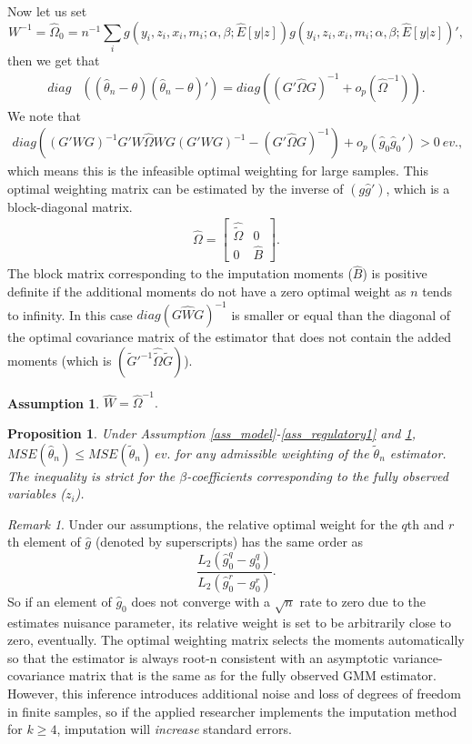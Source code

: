 \documentclass{article}
\newtheorem{assumption}{Assumption}
\newtheorem{proposition}{Proposition}
\theoremstyle{definition}
\theoremstyle{remark}
\newtheorem{remark}{Remark}
\begin{document}
Now let us set
\[W^{-1}=\hat{\Omega}_0=n^{-1}\sum_i g(y_i,z_i,x_i,m_i; \alpha,\beta; \hat{E}[y|z]) g(y_i,z_i,x_i,m_i; \alpha,\beta; \hat{E}[y|z])',
\]
then we get that
\begin{align}
diag&\left((\hat{\theta}_n -\theta)(\hat{\theta}_n -\theta)'\right)= diag\left((G'\hat{\Omega} G)^{-1} + o_p(\hat{\Omega}^{-1})\right).
\end{align}
We note that
\begin{align*}
diag\left((G'WG)^{-1} G'W \hat{\Omega}W G (G'WG)^{-1}-  (G'\hat{\Omega} G)^{-1}\right) + o_p(\hat{g}_0\hat{g}_0')> 0 \ ev.,
\end{align*}
which means this is the infeasible optimal weighting for large samples. This optimal weighting matrix can be estimated by the inverse of $(g\hat{g}')$, which is a block-diagonal matrix.
\begin{align}
\hat{\Omega} = \left[\begin{array}{cc}
\hat{\tilde{\Omega}} & 0 \\ 0 & \hat{B}
\end{array}\right].
\end{align}
The block matrix corresponding to the imputation moments ($\hat{B}$) is positive definite if the additional moments do not have a zero optimal weight as $n$ tends to infinity. In this case $diag(G\hat{W}G)^{-1}$ is smaller or equal than the diagonal of the optimal covariance matrix of the estimator that does not contain the added moments (which is $(\tilde{G}'^{-1}\hat{\tilde{\Omega}} \tilde{G})$).
\begin{assumption}\label{ass_optimalWeighting}
	$\hat{W} = \hat{\Omega}^{-1}.$
\end{assumption}
\begin{proposition}
	Under Assumption \ref{ass_model}-\ref{ass_regulatory1} and \ref{ass_optimalWeighting}, $MSE(\hat{\theta}_n)\leq MSE(\tilde{\theta}_n) \ ev.$ for any admissible weighting of the $\tilde{\theta}_n$ estimator. The inequality is strict for the $\beta$-coefficients corresponding to the fully observed variables ($z_i$).
\end{proposition}

\begin{remark}
	Under our assumptions, the relative optimal weight for the $q$th and $r$th element of $\hat{g}$ (denoted by superscripts) has the same order as
	\[\frac{L_2(\hat{g}_0^q-g_0^q)}{L_2(\hat{g}_0^r-g_0^r)}.
	\]
	So if an element of $\hat{g}_0$ does not converge with a $\sqrt{n}$ rate to zero due to the estimates nuisance parameter, its relative weight is set to be arbitrarily close to zero, eventually. The optimal weighting matrix selects the moments automatically so that the estimator is always root-n consistent with an asymptotic variance-covariance matrix that is the same as for the fully observed GMM estimator.\\
	However, this inference introduces additional noise and loss of degrees of freedom in finite samples, so if the applied researcher implements the imputation method for $k\geq 4$, imputation will \textit{increase} standard errors. 
\end{remark}
\end{document}
